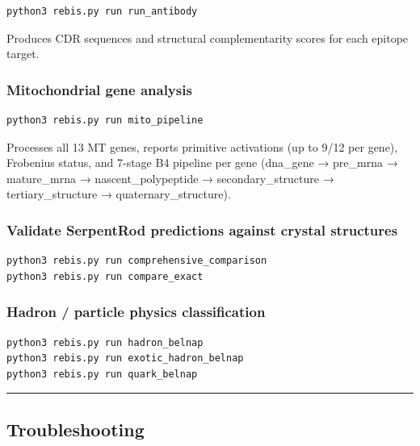 \begin{verbatim}
python3 rebis.py run run_antibody
\end{verbatim}

Produces CDR sequences and structural complementarity scores for each
epitope target.

\hypertarget{mitochondrial-gene-analysis}{%
\subsubsection{Mitochondrial gene
analysis}\label{mitochondrial-gene-analysis}}

\begin{verbatim}
python3 rebis.py run mito_pipeline
\end{verbatim}

Processes all 13 MT genes, reports primitive activations (up to 9/12 per
gene), Frobenius status, and 7-stage B4 pipeline per gene (dna\_gene →
pre\_mrna → mature\_mrna → nascent\_polypeptide → secondary\_structure →
tertiary\_structure → quaternary\_structure).

\hypertarget{validate-serpentrod-predictions-against-crystal-structures}{%
\subsubsection{Validate SerpentRod predictions against crystal
structures}\label{validate-serpentrod-predictions-against-crystal-structures}}

\begin{verbatim}
python3 rebis.py run comprehensive_comparison
python3 rebis.py run compare_exact
\end{verbatim}

\hypertarget{hadron-particle-physics-classification}{%
\subsubsection{Hadron / particle physics
classification}\label{hadron-particle-physics-classification}}

\begin{verbatim}
python3 rebis.py run hadron_belnap
python3 rebis.py run exotic_hadron_belnap
python3 rebis.py run quark_belnap
\end{verbatim}

\begin{center}\rule{0.5\linewidth}{0.5pt}\end{center}

\hypertarget{troubleshooting}{%
\subsection{Troubleshooting}\label{troubleshooting}}


